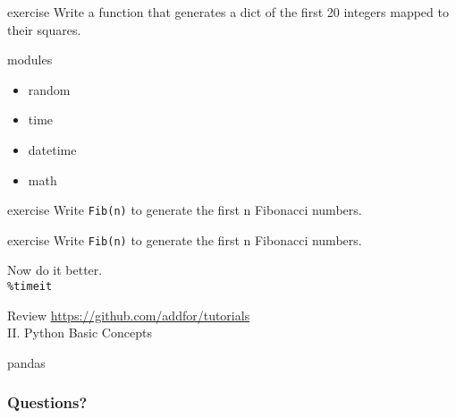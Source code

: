 \begin{frame}{exercise}
  Write a function that generates a dict of the first 20 integers
  mapped to their squares.
\end{frame}

\begin{frame}{modules}
  \begin{itemize}
  \item random
  \item time
  \item datetime
  \item math
  \end{itemize}
\end{frame}

\begin{frame}{exercise}
  Write \texttt{Fib(n)} to generate the first n Fibonacci numbers.
\end{frame}

\begin{frame}{exercise}
  Write \texttt{Fib(n)} to generate the first n Fibonacci numbers.

  Now do it better.\\
  \texttt{\%timeit}
\end{frame}

\begin{frame}{Review}
  \url{https://github.com/addfor/tutorials}\\[2mm]
  II. Python Basic Concepts
\end{frame}

\begin{frame}{pandas}
\end{frame}

\begin{frame}{}
\end{frame}

\begin{frame}{}
\end{frame}

\begin{frame}{}
\end{frame}

\begin{frame}{}
\end{frame}



\begin{frame}
  \frametitle{Questions?}
\end{frame}


